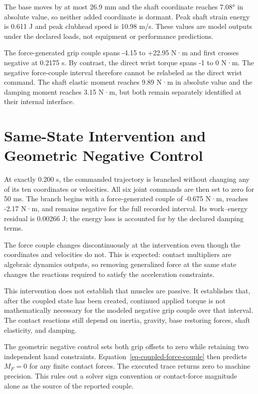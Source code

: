 \documentclass[
  letterpaper,
]{report}
\begin{document}
The base moves by at most 26.9 mm and the shaft coordinate reaches 7.08°
in absolute value, so neither added coordinate is dormant. Peak shaft
strain energy is 0.611 J and peak clubhead speed is 10.98 m/s. These
values are model outputs under the declared loads, not equipment or
performance predictions.

The force-generated grip couple spans -4.15 to +22.95 N·m and first
crosses negative at 0.2175 s. By contrast, the direct wrist torque spans
-1 to 0 N·m. The negative force-couple interval therefore cannot be
relabeled as the direct wrist command. The shaft elastic moment reaches
9.89 N·m in absolute value and the damping moment reaches 3.15 N·m, but
both remain separately identified at their internal interface.

\section{Same-State Intervention and Geometric Negative
Control}\label{sec-coupled-counterfactuals}

At exactly 0.200 s, the commanded trajectory is branched without
changing any of its ten coordinates or velocities. All six joint
commands are then set to zero for 50 ms. The branch begins with a
force-generated couple of -0.675 N·m, reaches -2.17 N·m, and remains
negative for the full recorded interval. Its work--energy residual is
0.00266 J; the energy loss is accounted for by the declared damping
terms.

The force couple changes discontinuously at the intervention even though
the coordinates and velocities do not. This is expected: contact
multipliers are algebraic dynamics outputs, so removing generalized
force at the same state changes the reactions required to satisfy the
acceleration constraints.

This intervention does not establish that muscles are passive. It
establishes that, after the coupled state has been created, continued
applied torque is not mathematically necessary for the modeled negative
grip couple over that interval. The contact reactions still depend on
inertia, gravity, base restoring forces, shaft elasticity, and damping.

The geometric negative control sets both grip offsets to zero while
retaining two independent hand constraints.
Equation~\ref{eq-coupled-force-couple} then predicts \(M_F=0\) for any
finite contact forces. The executed trace returns zero to machine
precision. This rules out a solver sign convention or contact-force
magnitude alone as the source of the reported couple.
\end{document}
